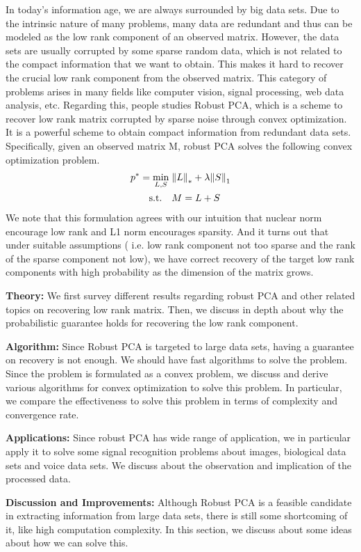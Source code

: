 \documentclass{../../common/projectreport}
\begin{document}
In today’s information age, we are always surrounded by big data sets. Due to the intrinsic nature of many problems, many data are redundant and thus can be modeled as the low rank component of an observed matrix. However, the data sets are usually corrupted by some sparse random data, which is not related to the compact information that we want to obtain. This makes it hard to recover the crucial low rank component from the observed matrix. This category of problems arises in many fields like computer vision, signal processing, web data analysis, etc. Regarding this, people studies Robust PCA, which is a scheme to recover low rank matrix corrupted by sparse noise through convex optimization. It is a powerful scheme to obtain compact information from redundant data sets. 
Specifically, given an observed matrix M, robust PCA solves the following convex optimization problem.  
%
\begin{align*}
p^* = \min_{L,S} \; &{\left\|L\right\|}_{*}^{} + \lambda {\left\|S\right\|}_{1}^{} \\
\text{s.t.} \quad &M = L+S
\end{align*}
%
We note that this formulation agrees with our intuition that nuclear norm encourage low rank and L1 norm encourages sparsity. And it turns out that under suitable assumptions ( i.e. low rank component not too sparse and the rank of the sparse component not low),  we have correct recovery of the target low rank components with high probability as the dimension of the matrix grows. 

\textbf{Theory:}
We first survey different results regarding robust PCA and other related topics on recovering low rank matrix. Then, we discuss in depth about why the probabilistic guarantee holds for recovering the low rank component. 

\textbf{Algorithm:}
Since Robust PCA is targeted to large data sets, having a guarantee on recovery is not enough. We should have fast algorithms to solve the problem. Since the problem is formulated as a convex problem, we discuss and derive various algorithms for convex optimization to solve this problem. In particular, we compare the effectiveness to solve this problem in terms of complexity and convergence rate.  

\textbf{Applications:}
Since robust PCA has wide range of application, we in particular apply it to solve some signal recognition problems about images, biological data sets and voice data sets. We discuss about the observation and implication of the processed data.

\textbf{Discussion and Improvements:}
Although Robust PCA is a feasible candidate in extracting information from large data sets, there is still some shortcoming of it, like high computation complexity. In this section, we discuss about some ideas about how we can solve this.

\end{document}

